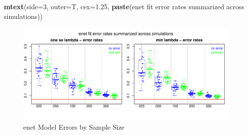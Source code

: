 \documentclass[
]{book}
\newenvironment{Shaded}{\begin{snugshade}}{\end{snugshade}}
\newcommand{\DataTypeTok}[1]{\textcolor[rgb]{0.13,0.29,0.53}{#1}}
\newcommand{\DecValTok}[1]{\textcolor[rgb]{0.00,0.00,0.81}{#1}}
\newcommand{\FloatTok}[1]{\textcolor[rgb]{0.00,0.00,0.81}{#1}}
\newcommand{\KeywordTok}[1]{\textcolor[rgb]{0.13,0.29,0.53}{\textbf{#1}}}
\newcommand{\NormalTok}[1]{#1}
\newcommand{\StringTok}[1]{\textcolor[rgb]{0.31,0.60,0.02}{#1}}
\begin{document}
\begin{Shaded}
\begin{Highlighting}[]
\KeywordTok{mtext}\NormalTok{(}\DataTypeTok{side=}\DecValTok{3}\NormalTok{, }\DataTypeTok{outer=}\NormalTok{T, }\DataTypeTok{cex=}\FloatTok{1.25}\NormalTok{, }\KeywordTok{paste}\NormalTok{(}\StringTok{\textquotesingle{}enet fit error rates summarized across simulations\textquotesingle{}}\NormalTok{))}
\end{Highlighting}
\end{Shaded}

\begin{figure}
\centering
\includegraphics{Static/figures/hcc5hmC-glmnetSuiteB-enet-simRes-errors-overSim-1.pdf}
\caption{\label{fig:hcc5hmC-glmnetSuiteB-enet-simRes-errors-overSim}enet Model Errors by Sample Size}
\end{figure}
\end{document}
